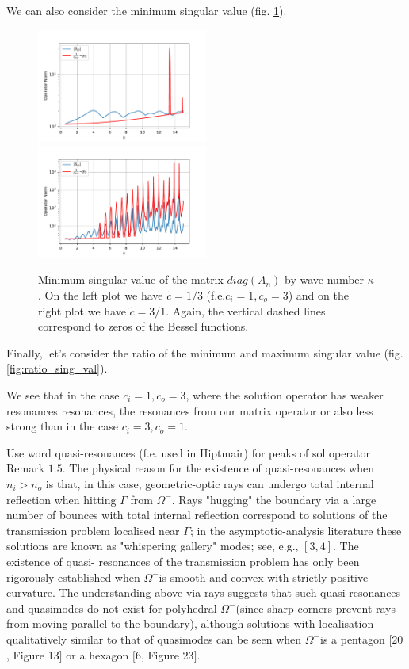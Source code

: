 \documentclass[10pt,journal,compsoc, onecolumn]{IEEEtran}
\begin{document}
We can also consider the minimum singular value (fig. \ref{fig:min_sing_val}).
\begin{figure}
    \includegraphics[width=0.5\textwidth]{InvertedMinimumSingularValuec_i1,0c_o3,0N_100eta1,0plotRangeStart_0,5plotRangeEnd_15,0indexrange_-4,0-0,0_y_0_49,358659709912466.pdf}
    \includegraphics[width=0.5\textwidth]{InvertedMinimumSingularValuec_i3,0c_o1,0N_100eta1,0plotRangeStart_0,5plotRangeEnd_15,0indexrange_-22,0-0,0_y_0_48,55939584304106.pdf}
    \caption{Minimum singular value of the matrix $diag(A_n)$ by wave number $\kappa$. 
     On the left plot we have $\tilde c = 1/3$ (f.e.$c_i = 1, c_o = 3$)
    and on the right plot we have $\tilde c = 3/1$.  Again, the vertical dashed lines correspond to zeros of the Bessel functions. }
   \label{fig:min_sing_val}
\end{figure}
Finally, let's consider the ratio of the minimum and maximum singular value (fig. \ref{fig:ratio_sing_val}).

We see that in the case $c_i = 1, c_o =3$, where the solution operator has weaker resonances resonances, 
the resonances from our matrix operator or also less strong 
than in the case $c_i = 3, c_o =1$. \cite{hiptmair2021spurious}

Use word quasi-resonances (f.e. used in Hiptmair) for peaks of sol operator 
Remark \(1.5 .\) The physical reason for the existence of quasi-resonances when \(n_{i}>n_{o}\) is that, in
this case, geometric-optic rays can undergo total internal reflection when hitting \(\Gamma\) from \(\Omega^{-}\). Rays
"hugging" the boundary via a large number of bounces with total internal reflection correspond
to solutions of the transmission problem localised near \(\Gamma\); in the asymptotic-analysis literature
these solutions are known as "whispering gallery" modes; see, e.g., \([3,4]\). The existence of quasi-
resonances of the transmission problem has only been rigorously established when \(\Omega^{-}\)is smooth
and convex with strictly positive curvature. The understanding above via rays suggests that such
quasi-resonances and quasimodes do not exist for polyhedral \(\Omega^{-}\)(since sharp corners prevent rays
from moving parallel to the boundary), although solutions with localisation qualitatively similar to
that of quasimodes can be seen when \(\Omega^{-}\)is a pentagon \([20\), Figure 13\(]\) or a hexagon \([6\), Figure 23\(] .\)
\end{document}
